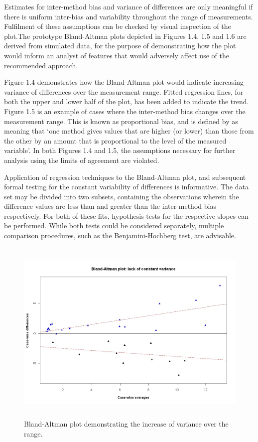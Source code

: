 \documentclass[12pt, a4paper]{report}
\theoremstyle{plain}
\theoremstyle{definition}
\theoremstyle{remark}
\begin{document}
Estimates for inter-method bias and variance of differences are only meaningful if there is uniform inter-bias and variability throughout the range of measurements. Fulfilment of these assumptions can be checked by visual inspection of the plot.The prototype Bland-Altman plots depicted in Figures 1.4, 1.5 and 1.6 are derived from simulated data, for the purpose of demonstrating how the plot would inform an analyst of features that would adversely affect use of the recommended approach.

Figure 1.4 demonstrates how the Bland-Altman plot would indicate
increasing variance of differences over the measurement range.
Fitted regression lines, for both the upper and lower half of the
plot, has been added to indicate the trend. Figure 1.5 is an example of cases where the inter-method bias changes over the
measurement range. This is known as proportional bias, and is defined by \citet{ludbrook97} as meaning that `one method gives
values that are higher (or lower) than those from the other by an
amount that is proportional to the level of the measured variable'. In both Figures 1.4 and 1.5, the assumptions necessary
for further analysis using the limits of agreement are violated.

Application of regression techniques to the Bland-Altman plot, and
subsequent formal testing for the constant variability of
differences is informative. The data set may be divided into two
subsets, containing the observations wherein the difference values
are less than and greater than the inter-method bias respectively.
For both of these fits, hypothesis tests for the respective slopes
can be performed. While both tests could be considered separately,
multiple comparison procedures, such as the Benjamini-Hochberg
\citep{BH} test, are advisable.

\begin{figure}[h!]
	\begin{center}
		\includegraphics[height=90mm]{images/BAFanEffect.jpeg}
		\caption{Bland-Altman plot demonstrating the increase of variance over the range.}\label{BAFanEffect}
	\end{center}
\end{figure}
\end{document}
